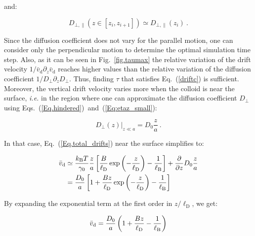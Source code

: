 and:

\begin{equation}
	D_{\bot, \parallel}(z \in [z_i, z_{i+1}]) \simeq D_{\bot, \parallel}(z_i) ~.
\end{equation}

Since the diffusion coefficient does not vary for the parallel motion, one can consider only the perpendicular motion to determine the optimal simulation time step. Also, as it can be seen in Fig.~\ref{fig.taumax} the relative variation of the drift velocity $1/\bar{v}_\mathrm{d} \partial_z \bar{v}_\mathrm{d}$ reaches higher values than the relative variation of the diffusion coefficient $1/D_\bot \partial_z D_\bot$. Thus, finding $\tau$ that satisfies Eq.~(\ref{driftc}) is sufficient. Moreover, the vertical drift velocity varies more when the colloid is near the surface, \textit{i.e.} in the region where one can approximate the diffusion coefficient $D_\bot$ using Eqs.~(\ref{Eq.hindered})~and~(\ref{Eq:etaz_small}):

\begin{equation}
	\left.D_\bot  (z)\right|_{z\ll a} = D_ 0 \frac{z}{a} ~.
	\label{Dsmall}
\end{equation}

In that case, Eq.~(\ref{Eq.total_drifts}) near the surface simplifies to:

\begin{equation}
	\begin{aligned}
		\bar{v}_\textnormal{d} &\simeq  \frac{k_\mathrm{B}T}{\gamma_0} \frac{z}{a} \left[\frac{B}{\ell_\mathrm{D}} \exp \left(-\frac{z}{\ell_\mathrm{D}}\right) - \frac{1}{\ell_{\mathrm{B}}}  \right] + \frac{\partial}{\partial z} D_0 \frac{z}{a} \\
		&= \frac{D_0}{a} \left[ 1 + \frac{Bz}{\ell_\mathrm{D}} \exp \left(-\frac{z}{\ell_\mathrm{D}}\right)- \frac{1}{\ell_{\mathrm{B}}}\right]
	\end{aligned}
\end{equation}

By expanding the exponential term at the first order in $z/\ell_\mathrm{D}$, we get:

\begin{equation}
	\begin{aligned}
		\bar{v}_\textnormal{d}  = \frac{D_0}{a} \left( 1 + \frac{B z}{\ell_\mathrm{D}} - \frac{1}{\ell_{\mathrm{B}}}\right)
	\end{aligned}
	\label{drifts_short}
\end{equation}

